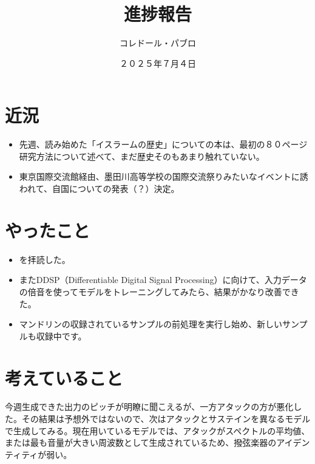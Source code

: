 \documentclass[a4paper, 12pt]{article}
\title{進捗報告}
\author{コレドール・パブロ}
\date{２０２５年７月４日}
\begin{document}
\maketitle

\section*{近況}
\begin{itemize}
    \item 先週、読み始めた「イスラームの歴史」についての本は、最初の８０ページ研究方法について述べて、まだ歴史そのもあまり触れていない。
    \item 東京国際交流館経由、墨田川高等学校の国際交流祭りみたいなイベントに誘われて、自国についての発表（？）決定。
\end{itemize} 

\section*{やったこと}
\begin{itemize}
    \item \cite{sitrano}を拝読した。
    \item またDDSP（Differentiable Digital Signal Processing）\cite{DDSP_Traditional}に向けて、入力データの倍音を使ってモデルをトレーニングしてみたら、結果がかなり改善できた。
    \item マンドリンの収録されているサンプルの前処理を実行し始め、新しいサンプルも収録中です。
\end{itemize}

\section*{考えていること}

今週生成できた出力のピッチが明瞭に聞こえるが、一方アタックの方が悪化した。その結果は予想外ではないので、次はアタックとサステインを異なるモデルで生成してみる。現在用いているモデルでは、アタックがスペクトルの平均値、または最も音量が大きい周波数として生成されているため、撥弦楽器のアイデンティティが弱い。

\end{document}
